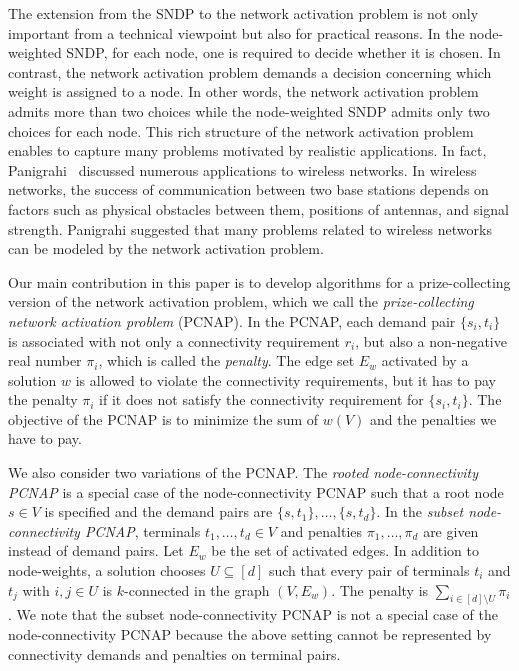 \documentclass[11pt]{article}
\begin{document}
The extension from the SNDP to the network activation problem is not
only important from a technical viewpoint but also for practical
reasons. In the node-weighted SNDP, for each node, one is required to decide whether it
is chosen.  In contrast, the network activation problem demands
a decision concerning which weight is assigned to a node. In other words, the
network activation problem admits more than two choices while the
node-weighted SNDP admits only two choices for each node.  This rich
structure of the network activation problem enables to capture many
problems motivated by realistic applications.  In fact,
Panigrahi~\cite{Panigrahi11wireless} discussed numerous applications to
wireless networks.  In wireless networks, the success of communication
between two base stations depends on factors such as physical
obstacles between them, positions of antennas, and signal strength.
Panigrahi suggested that many problems related to wireless networks can
be modeled by the network activation problem.

Our main contribution in this paper is to develop algorithms for 
a prize-collecting version of the network activation
problem, which we call the {\em prize-collecting network activation
problem} (PCNAP). 
In the PCNAP,
each demand pair $\{s_i,t_i\}$ is associated with not only a
connectivity requirement $r_i$, but also a non-negative real number
$\pi_i$, which is called the \emph{penalty}.
The edge set $E_w$ activated by a solution $w$ 
is allowed to violate the
connectivity requirements,
but it has to pay the penalty $\pi_i$ if it does not satisfy the connectivity
requirement for $\{s_i,t_i\}$. 
The objective of the PCNAP
is to minimize the sum of 
$w(V)$ and the penalties we have to pay.

We also consider two variations of the PCNAP.
The {\em rooted node-connectivity PCNAP} is a special case of the
node-connectivity PCNAP such that 
a root node $s \in V$ is specified and the demand pairs
are $\{s,t_1\},\ldots,\{s,t_d\}$.
In the {\em subset node-connectivity PCNAP},
terminals $t_1,\ldots,t_d \in V$ 
and penalties $\pi_1,\ldots,\pi_d$ are given instead of demand pairs.
Let $E_w$ be the set of activated edges. 
In addition to node-weights,
a solution chooses $U \subseteq [d]$ such that 
every pair of terminals $t_i$ and $t_j$ 
with $i,j \in U$
is $k$-connected in the graph $(V,E_w)$.
The penalty is $\sum_{i \in [d]\setminus U}\pi_i$.
We note that the subset node-connectivity PCNAP is not a special case of
the node-connectivity PCNAP because the above setting cannot be represented by 
connectivity demands and penalties on terminal pairs.
\end{document}
